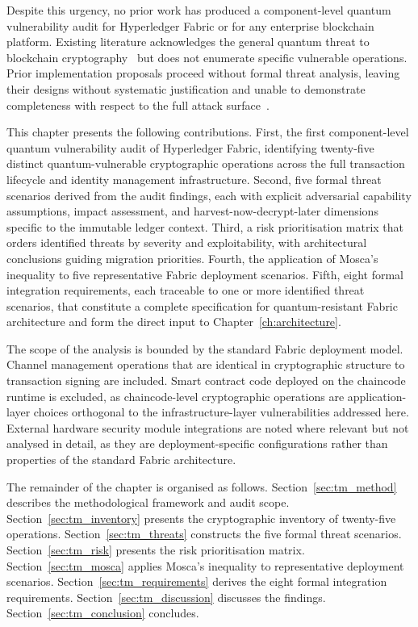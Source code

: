 \documentclass[conference]{IEEEtran}
\begin{document}
Despite this urgency, no prior work has produced a component-level quantum
vulnerability audit for Hyperledger Fabric or for any enterprise
blockchain platform. Existing literature acknowledges the general quantum
threat to blockchain cryptography~\cite{fernandez2020, yang2024survey}
but does not enumerate specific vulnerable operations. Prior implementation
proposals proceed without formal threat analysis, leaving their designs
without systematic justification and unable to demonstrate completeness
with respect to the full attack surface~\cite{holcomb2021, campbell2019,
hu2025prototype, razdan2025postquantum}.

This chapter presents the following contributions. First, the first
component-level quantum vulnerability audit of Hyperledger Fabric,
identifying twenty-five distinct quantum-vulnerable cryptographic
operations across the full transaction lifecycle and identity management
infrastructure. Second, five formal threat scenarios derived from the
audit findings, each with explicit adversarial capability assumptions,
impact assessment, and harvest-now-decrypt-later dimensions specific to
the immutable ledger context. Third, a risk prioritisation matrix that
orders identified threats by severity and exploitability, with
architectural conclusions guiding migration priorities. Fourth, the
application of Mosca's inequality to five representative Fabric
deployment scenarios. Fifth, eight formal integration requirements, each
traceable to one or more identified threat scenarios, that constitute a
complete specification for quantum-resistant Fabric architecture and form
the direct input to Chapter~\ref{ch:architecture}.

The scope of the analysis is bounded by the standard Fabric deployment
model. Channel management operations that are identical in cryptographic
structure to transaction signing are included. Smart contract code
deployed on the chaincode runtime is excluded, as chaincode-level
cryptographic operations are application-layer choices orthogonal to
the infrastructure-layer vulnerabilities addressed here. External
hardware security module integrations are noted where relevant but not
analysed in detail, as they are deployment-specific configurations
rather than properties of the standard Fabric architecture.

The remainder of the chapter is organised as follows.
Section~\ref{sec:tm_method} describes the methodological framework and
audit scope. Section~\ref{sec:tm_inventory} presents the cryptographic
inventory of twenty-five operations. Section~\ref{sec:tm_threats}
constructs the five formal threat scenarios. Section~\ref{sec:tm_risk}
presents the risk prioritisation matrix. Section~\ref{sec:tm_mosca}
applies Mosca's inequality to representative deployment scenarios.
Section~\ref{sec:tm_requirements} derives the eight formal integration
requirements. Section~\ref{sec:tm_discussion} discusses the findings.
Section~\ref{sec:tm_conclusion} concludes.
\end{document}
